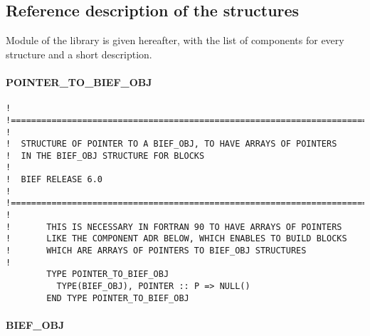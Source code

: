 \subsection{Reference description of the structures}

Module  of the library is given hereafter, with the list of
components for every structure and a short description.

\paragraph{POINTER\_TO\_BIEF\_OBJ}

\begin{lstlisting}[language=TelFortran]
!
!=======================================================================
!
!  STRUCTURE OF POINTER TO A BIEF_OBJ, TO HAVE ARRAYS OF POINTERS
!  IN THE BIEF_OBJ STRUCTURE FOR BLOCKS
!
!  BIEF RELEASE 6.0
!
!=======================================================================
!
!       THIS IS NECESSARY IN FORTRAN 90 TO HAVE ARRAYS OF POINTERS
!       LIKE THE COMPONENT ADR BELOW, WHICH ENABLES TO BUILD BLOCKS
!       WHICH ARE ARRAYS OF POINTERS TO BIEF_OBJ STRUCTURES
!
        TYPE POINTER_TO_BIEF_OBJ
          TYPE(BIEF_OBJ), POINTER :: P => NULL()
        END TYPE POINTER_TO_BIEF_OBJ
\end{lstlisting}


\paragraph{BIEF\_OBJ}


